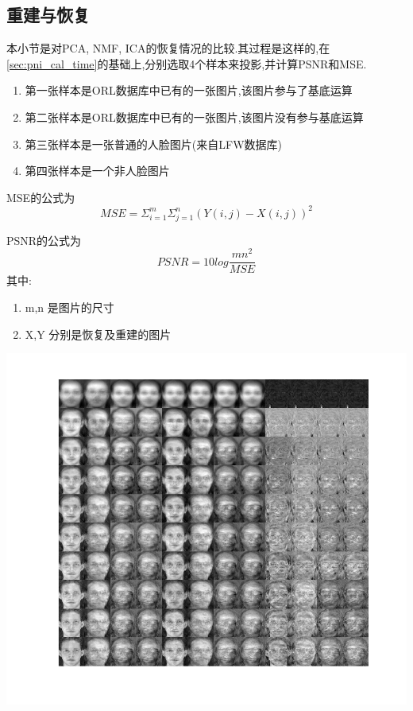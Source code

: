 \subsection{重建与恢复}
\label{sec:pni_recon}
本小节是对PCA, NMF, ICA的恢复情况的比较.其过程是这样的,在\ref{sec:pni_cal_time}的基础上,分别选取4个样本来投影,并计算PSNR和MSE. 

\begin{enumerate}
	\item 第一张样本是ORL数据库中已有的一张图片,该图片参与了基底运算
	\item 第二张样本是ORL数据库中已有的一张图片,该图片没有参与基底运算
	\item 第三张样本是一张普通的人脸图片(来自LFW数据库)
	\item 第四张样本是一个非人脸图片
\end{enumerate}
MSE的公式为\begin{equation}
		MSE = \Sigma_{i=1}^m\Sigma_{j=1}^n(Y(i,j) - X(i,j))^2	\end{equation}
	
		PSNR的公式为
\begin{equation}
	PSNR = 10 log \frac{mn^2}{MSE}
\end{equation}
其中:
\begin{enumerate}
	\item m,n 是图片的尺寸
	\item X,Y 分别是恢复及重建的图片
\end{enumerate}
\begin{center}
\begin{minipage}[t]{\linewidth}
\center
{
\includegraphics[width=\textwidth]{Img/pni_reconstr.png} 
\label{fig:ica_base}
}
\end{minipage}
\medskip
\end{center}

